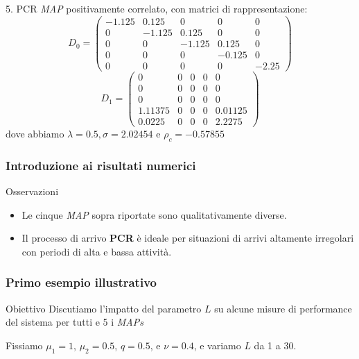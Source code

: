 \documentclass{beamer}
\begin{document}
\begin{frame}
    \frametitle{}
    \begin{block}{5. PCR}
        \emph{MAP} positivamente correlato, con matrici di rappresentazione:
        \begin{equation*}
            D_0 =
            \begin{pmatrix}
                -1.125 & 0.125 & 0 & 0 & 0 \\
                0 & -1.125 & 0.125 & 0 & 0 \\
                0 & 0 & -1.125 & 0.125 & 0 \\
                0 & 0 & 0 & -0.125 & 0 \\
                0 & 0 & 0 & 0 & -2.25
            \end{pmatrix}
        \end{equation*}
        \begin{equation*}
            D_1 =
            \begin{pmatrix}
                0 & 0 & 0 & 0 & 0 \\
                0 & 0 & 0 & 0 & 0 \\
                0 & 0 & 0 & 0 & 0 \\
                1.11375 & 0 & 0 & 0 & 0.01125 \\
                0.0225 & 0 & 0 & 0 & 2.2275
            \end{pmatrix}
        \end{equation*}
        dove abbiamo $\lambda = 0.5, \sigma = 2.02454$ e $\rho_c =  -0.57855$
    \end{block}
\end{frame}


\begin{frame}
    \frametitle{Introduzione ai risultati numerici}
    \begin{block}{Osservazioni}
        \begin{itemize}
            \item Le cinque \emph{MAP} sopra riportate sono qualitativamente diverse.
            \item Il processo di arrivo \textbf{PCR} è ideale per situazioni di arrivi altamente irregolari con periodi di alta e bassa attività.
        \end{itemize}
    \end{block}
\end{frame}


\begin{frame}
    \frametitle{Primo esempio illustrativo}
    \begin{block}{Obiettivo}
        Discutiamo l'impatto del parametro $L$ su alcune misure di performance del sistema per tutti e 5 i \emph{MAPs}
    \end{block}
    Fissiamo $\mu_1=1$, $\mu_2=0.5$, $q=0.5$, e $\nu=0.4$, e variamo $L$ da 1 a 30.
\end{frame}
\end{document}

